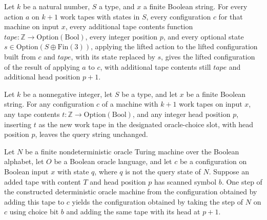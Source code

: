 \begin{theorem}
\label{Turing.oracleChoiceAction_apply}
\leanok
{}
Let $k$ be a natural number, $S$ a type, and $x$ a finite Boolean string. For every
action $a$ on $k+1$ work tapes with states in $S$, every configuration $c$ for that
machine on input $x$, every additional tape contents function $tape : \mathbb{Z} \to
\mathrm{Option}(\mathrm{Bool})$, every integer position $p$, and every optional state $s
\in \mathrm{Option}(S \oplus \mathrm{Fin}(3))$, applying the lifted action to the lifted
configuration built from $c$ and $tape$, with its state replaced by $s$, gives the
lifted configuration of the result of applying $a$ to $c$, with additional tape contents
still $tape$ and additional head position $p+1$.
\end{theorem}

\begin{theorem}
\label{Turing.oracleChoiceCfg_query}
\leanok
{}
Let $k$ be a nonnegative integer, let $S$ be a type, and let $x$ be a finite Boolean
string. For any configuration $c$ of a machine with $k+1$ work tapes on input $x$, any
tape contents $t\colon\mathbb{Z}\to\mathrm{Option}(\mathrm{Bool})$, and any integer head
position $p$, inserting $t$ as the new work tape in the designated oracle-choice slot,
with head position $p$, leaves the query string unchanged.
\end{theorem}

\begin{theorem}
\label{Turing.oracleChoice_step}
\leanok
{}
Let $N$ be a finite nondeterministic oracle Turing machine over the Boolean alphabet,
let $O$ be a Boolean oracle language, and let $c$ be a configuration on Boolean input
$x$ with state $q$, where $q$ is not the query state of $N$. Suppose an added tape with
content $T$ and head position $p$ has scanned symbol $b$. One step of the constructed
deterministic oracle machine from the configuration obtained by adding this tape to $c$
yields the configuration obtained by taking the step of $N$ on $c$ using choice bit $b$
and adding the same tape with its head at $p+1$.
\end{theorem}

